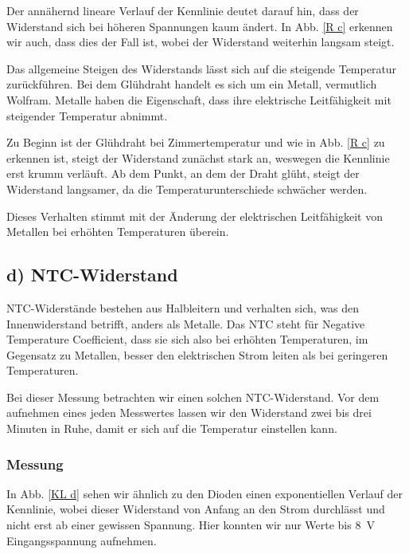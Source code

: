\documentclass[11pt,a4paper,titlepage, ngerman]{article}
\begin{document}
				Der annähernd lineare Verlauf der Kennlinie deutet darauf hin, dass der Widerstand sich bei höheren Spannungen kaum ändert.
				In Abb. \ref{R c} erkennen wir auch, dass dies der Fall ist, wobei der Widerstand weiterhin langsam steigt.
				
				Das allgemeine Steigen des Widerstands lässt sich auf die steigende Temperatur zurückführen.
				Bei dem Glühdraht handelt es sich um ein Metall, vermutlich Wolfram.
				Metalle haben die Eigenschaft, dass ihre elektrische Leitfähigkeit mit steigender Temperatur abnimmt.
				
				Zu Beginn ist der Glühdraht bei Zimmertemperatur und wie in Abb. \ref{R c} zu erkennen ist, steigt der Widerstand zunächst stark an, weswegen die Kennlinie erst krumm verläuft.
				Ab dem Punkt, an dem der Draht glüht, steigt der Widerstand langsamer, da die Temperaturunterschiede schwächer werden.
				
				Dieses Verhalten stimmt mit der Änderung der elektrischen Leitfähigkeit von Metallen bei erhöhten Temperaturen überein.
				
		\subsection{d) NTC-Widerstand} 
			
			NTC-Widerstände bestehen aus Halbleitern und verhalten sich, was den Innenwiderstand betrifft, anders als Metalle.
			Das \glqq NTC\grqq{} steht für \glqq Negative Temperature Coefficient\grqq{}, dass sie sich also bei erhöhten Temperaturen, im Gegensatz zu Metallen, besser den elektrischen Strom leiten als bei geringeren Temperaturen.
			
			Bei dieser Messung betrachten wir einen solchen NTC-Widerstand.
			Vor dem aufnehmen eines jeden Messwertes lassen wir den Widerstand zwei bis drei Minuten in Ruhe, damit er sich auf die Temperatur einstellen kann.%
			
			\subsubsection*{Messung}
			
				In Abb. \ref{KL d} sehen wir ähnlich zu den Dioden einen exponentiellen Verlauf der Kennlinie, wobei dieser Widerstand von Anfang an den Strom durchlässt und nicht erst ab einer gewissen Spannung.
				Hier konnten wir nur Werte bis \SI{8}{\V} Eingangsspannung aufnehmen.
				
\end{document}
